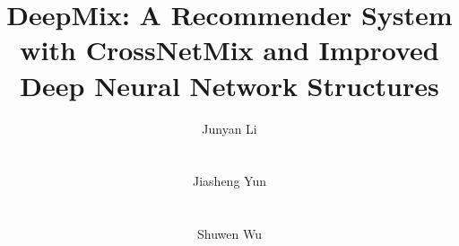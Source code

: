 \documentclass{sigkddExp}
\begin{document}
%

\title{DeepMix: A Recommender System with CrossNetMix and Improved Deep Neural Network Structures}
%

%


\author{
%
\alignauthor Junyan Li \\
       \\
       \\
\alignauthor Jiasheng Yun\\
       \\
       \\
\alignauthor Shuwen Wu\\
       \\
       \\
}
\end{document}
